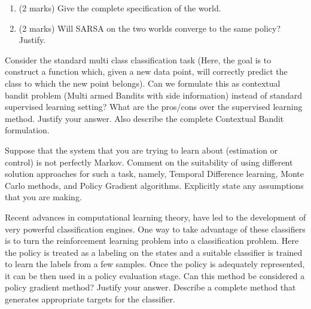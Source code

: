 \documentclass[addpoints,12pt,solution]{exam}
\begin{document}
\begin{questions}
        \begin{enumerate}[label=(\alph*)]

            \item (2 marks) Give the complete specification of the world.

            \begin{solution}


            \end{solution}


            \item (2 marks) Will SARSA on the two worlds converge to the same policy? Justify.

            \begin{solution}

            \end{solution}

        \end{enumerate}

         Consider the standard multi class classification task (Here, the goal is to construct a function which, given a new data point, will correctly predict the class to which the new point belongs). Can we formulate this as contextual bandit problem (Multi armed Bandits with side information) instead of standard supervised learning setting? What are the pros/cons over the supervised learning method. Justify your answer. Also describe the complete Contextual Bandit formulation.

        \begin{solution}

        \end{solution}

        \question[5] [TD, MC, PG] Suppose that the system that you are trying to learn about (estimation or control) is not perfectly Markov. Comment on the suitability of using different solution approaches for such a task, namely, Temporal Difference learning, Monte Carlo methods, and Policy Gradient algorithms. Explicitly state any assumptions that you are making.
        \begin{solution}

        \end{solution}

        \question[5] [PG] Recent advances in computational learning theory, have led to the development of very powerful classification engines. One way to take advantage of these classifiers is to turn the reinforcement learning problem into a classification problem. Here the policy is treated as a labeling on the states and a suitable classifier is trained to learn the labels from a few samples. Once the policy is adequately represented, it can be then used in a policy evaluation stage. Can this method be considered a policy gradient method? Justify your answer. Describe a complete method that generates appropriate targets for the classifier.
        \begin{solution}

        \end{solution}

    \end{questions}
\end{document}

